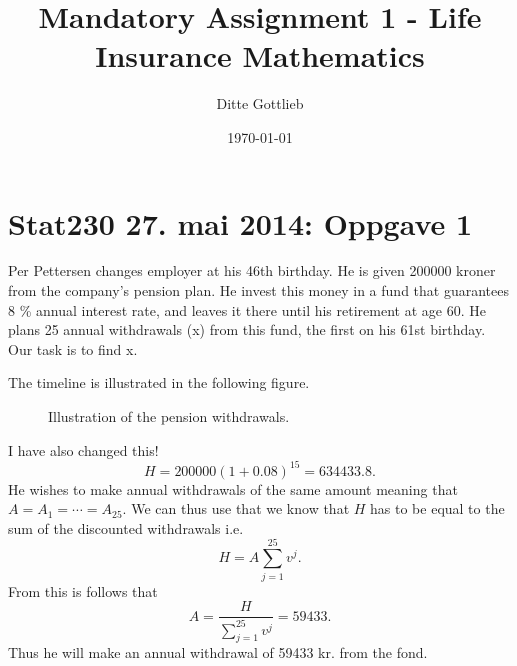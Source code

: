 \documentclass[a4paper,colorinlistoftodos, 10pt]{article}
\title{Mandatory Assignment 1 - Life Insurance Mathematics}
\author{Ditte Gottlieb}
\date{\today}
\begin{document}
\maketitle

\section*{Stat230 27. mai 2014: Oppgave 1}

Per Pettersen changes employer at his 46th birthday. He is given 200000 kroner from
the company’s pension plan. He invest this money in a fund that guarantees 8 \% annual
interest rate, and leaves it there until his retirement at age 60. He plans 25 annual
withdrawals (x) from this fund, the first on his 61st birthday. Our task is to find x.\newline

\noindent The timeline is illustrated in the following figure.
\begin{figure}[ht]
\centering
{}
\caption{Illustration of the pension withdrawals.}
\end{figure}

\noindent I have also changed this!
\begin{equation*}
    H = 200000 (1 + 0.08)^{15} = 634433.8.
\end{equation*}
He wishes to make annual withdrawals of the same amount meaning that $A = A_1 = \cdots = A_{25}$. We can thus use that we know that $H$ has to be equal to the sum of the discounted withdrawals i.e.
\begin{equation*}
    H = A\sum_{j=1}^{25} v^j.
\end{equation*}
From this is follows that 
\begin{equation*}
    A = \frac{H}{\sum_{j=1}^{25} v^j} = 59433.
\end{equation*}
Thus he will make an annual withdrawal of 59433 kr. from the fond.
\end{document}
